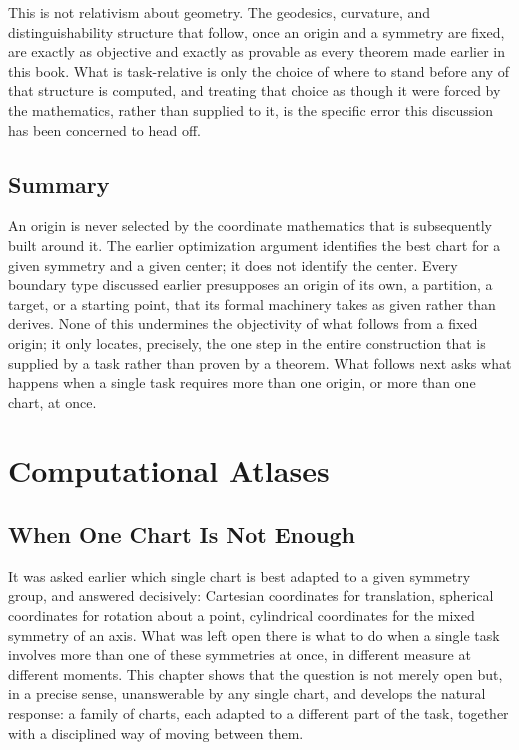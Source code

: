 \documentclass[11pt,fleqn]{book}
\numberwithin{equation}{chapter}
\theoremstyle{plain}
\theoremstyle{definition}
\theoremstyle{remark}
\begin{document}
This is not relativism about geometry. The geodesics, curvature, and distinguishability structure that follow, once an origin and a symmetry are fixed, are exactly as objective and exactly as provable as every theorem made earlier in this book. What is task-relative is only the choice of where to stand before any of that structure is computed, and treating that choice as though it were forced by the mathematics, rather than supplied to it, is the specific error this discussion has been concerned to head off.

\section{Summary}

An origin is never selected by the coordinate mathematics that is subsequently built around it. The earlier optimization argument identifies the best chart for a given symmetry and a given center; it does not identify the center. Every boundary type discussed earlier presupposes an origin of its own, a partition, a target, or a starting point, that its formal machinery takes as given rather than derives. None of this undermines the objectivity of what follows from a fixed origin; it only locates, precisely, the one step in the entire construction that is supplied by a task rather than proven by a theorem. What follows next asks what happens when a single task requires more than one origin, or more than one chart, at once.



\chapter{Computational Atlases}

\section{When One Chart Is Not Enough}

It was asked earlier which single chart is best adapted to a given symmetry group, and answered decisively: Cartesian coordinates for translation, spherical coordinates for rotation about a point, cylindrical coordinates for the mixed symmetry of an axis. What was left open there is what to do when a single task involves more than one of these symmetries at once, in different measure at different moments. This chapter shows that the question is not merely open but, in a precise sense, unanswerable by any single chart, and develops the natural response: a family of charts, each adapted to a different part of the task, together with a disciplined way of moving between them.
\end{document}
